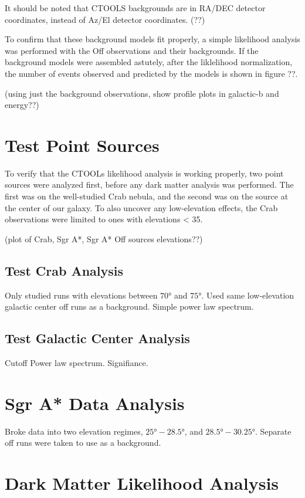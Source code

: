 It should be noted that CTOOLS backgrounds are in RA/DEC detector coordinates, instead of Az/El detector coordinates. (??)

To confirm that these background models fit properly, a simple likelihood analysis was performed with the Off observations and their backgrounds.
If the background models were assembled astutely, after the liklelihood normalization, the number of events observed and predicted by the models is shown in figure ??.

(using just the background observations, show profile plots in galactic-b and energy??)


\section{Test Point Sources}
To verify that the CTOOLs likelihood analysis is working properly, two point sources were analyzed first, before any dark matter analysis was performed.
The first was on the well-studied Crab nebula, and the second was on the source at the center of our galaxy.
To also uncover any low-elevation effects, the Crab observations were limited to ones with elevations < 35\degree.

(plot of Crab, Sgr A*, Sgr A* Off sources elevations??)

\subsection{Test Crab Analysis}

Only studied runs with elevations between $\ang{70}$ and $\ang{75}$.
Used same low-elevation galactic center off runs as a background.
Simple power law spectrum.

\subsection{Test Galactic Center Analysis}

Cutoff Power law spectrum.
Signifiance.

\section{Sgr A* Data Analysis}
Broke data into two elevation regimes, $ \ang{25}-\ang{28.5} $, and $ \ang{28.5}-\ang{30.25} $.
Separate off runs were taken to use as a background.


\section{Dark Matter Likelihood Analysis}

